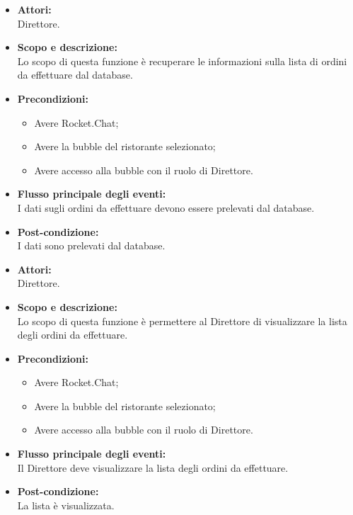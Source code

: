 
\begin{itemize}
	\item \textbf{Attori:}
	\\Direttore.
	\item \textbf{Scopo e descrizione:} 
	\\Lo scopo di questa funzione è recuperare le informazioni sulla lista di ordini da effettuare dal database.
	\item \textbf{Precondizioni:}
	\begin{itemize}
		\item Avere Rocket.Chat;
		\item Avere la bubble del ristorante selezionato;
		\item Avere accesso alla bubble con il ruolo di Direttore.
	\end{itemize}
	\item \textbf{Flusso principale degli eventi:}
	\\I dati sugli ordini da effettuare devono essere prelevati dal database.
	\item \textbf{Post-condizione:}
	\\I dati sono prelevati dal database.
\end{itemize}


\begin{itemize}
	\item \textbf{Attori:}
	\\Direttore.
	\item \textbf{Scopo e descrizione:} 
	\\Lo scopo di questa funzione è permettere al Direttore di visualizzare la lista degli ordini da effettuare.
	\item \textbf{Precondizioni:}
	\begin{itemize}
		\item Avere Rocket.Chat;
		\item Avere la bubble del ristorante selezionato;
		\item Avere accesso alla bubble con il ruolo di Direttore.
	\end{itemize}
	\item \textbf{Flusso principale degli eventi:}
	\\Il Direttore deve visualizzare la lista degli ordini da effettuare.
	\item \textbf{Post-condizione:}
	\\La lista è visualizzata.
\end{itemize}

